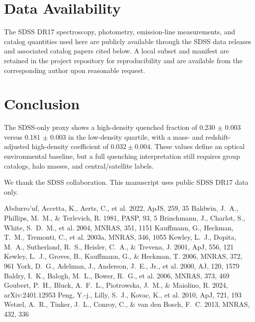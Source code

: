 \documentclass[twocolumn]{aastex631}
\begin{document}
\section{Data Availability}\label{sec:data-avail}
The SDSS DR17 spectroscopy, photometry, emission-line measurements, and catalog quantities used here are publicly available through the SDSS data releases and associated catalog papers cited below. A local subset and manifest are retained in the project repository for reproducibility and are available from the corresponding author upon reasonable request.

\section{Conclusion}\label{sec:conclusion}
The SDSS-only proxy shows a high-density quenched fraction of 0.230 $\pm$ 0.003 versus 0.181 $\pm$ 0.003 in the low-density quartile, with a mass- and redshift-adjusted high-density coefficient of $0.032 \pm 0.004$. These values define an optical environmental baseline, but a full quenching interpretation still requires group catalogs, halo masses, and central/satellite labels.

\acknowledgments
We thank the SDSS collaboration. This manuscript uses public SDSS DR17 data only.


\begin{thebibliography}{}
 Abdurro'uf, Accetta, K., Aerts, C., et al. 2022, ApJS, 259, 35
 Baldwin, J.~A., Phillips, M.~M., \& Terlevich, R. 1981, PASP, 93, 5
 Brinchmann, J., Charlot, S., White, S.~D.~M., et al. 2004, MNRAS, 351, 1151
 Kauffmann, G., Heckman, T.~M., Tremonti, C., et al. 2003a, MNRAS, 346, 1055
 Kewley, L.~J., Dopita, M.~A., Sutherland, R.~S., Heisler, C.~A., \& Trevena, J. 2001, ApJ, 556, 121
 Kewley, L.~J., Groves, B., Kauffmann, G., \& Heckman, T. 2006, MNRAS, 372, 961
 York, D.~G., Adelman, J., Anderson, J.~E., Jr., et al. 2000, AJ, 120, 1579
 Baldry, I.~K., Balogh, M.~L., Bower, R.~G., et al. 2006, MNRAS, 373, 469
 Goubert, P.~H., Bluck, A.~F.~L., Piotrowska, J.~M., \& Maiolino, R. 2024, arXiv:2401.12953
 Peng, Y.-j., Lilly, S.~J., Kovac, K., et al. 2010, ApJ, 721, 193
 Wetzel, A.~R., Tinker, J.~L., Conroy, C., \& van den Bosch, F.~C. 2013, MNRAS, 432, 336
\end{thebibliography}
\end{document}
